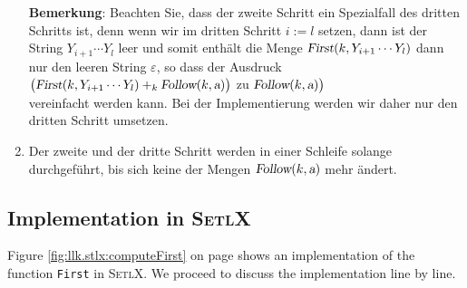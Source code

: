 \begin{enumerate}
      \textbf{Bemerkung}:  Beachten Sie, dass der zweite Schritt ein Spezialfall des
      dritten Schritts ist, denn wenn wir im dritten Schritt $i := l$ setzen, dann ist
      der String $Y_{i+1} \cdots Y_l$ leer und somit enthält die Menge
      $\textsl{First}(k, Y_{i+1}\cdots Y_l)$ dann nur den leeren String $\varepsilon$, so
      dass der Ausdruck
      \\[0.2cm]
      \hspace*{1.3cm}
      $\bigl(\textsl{First}(k, Y_{i+1} \cdots Y_l) +_k \textsl{Follow}(k,\textsl{a})\bigr)$  \quad
      zu \quad $\textsl{Follow}(k,\textsl{a})\bigr)$
      \\[0.2cm]
      vereinfacht werden kann.  Bei der Implementierung werden wir daher nur den dritten
      Schritt umsetzen.
\item Der zweite und der dritte Schritt werden in einer Schleife solange durchgeführt, bis sich keine
      der Mengen $\textsl{Follow}(k, \textsl{a})$ mehr ändert.
\end{enumerate}

\subsection{Implementation in \textsc{SetlX}}
Figure \ref{fig:llk.stlx:computeFirst} on page \pageref{fig:llk.stlx:computeFirst} shows an
implementation of the function \texttt{First} in \textsc{SetlX}.  We proceed to discuss the
implementation line by line.




